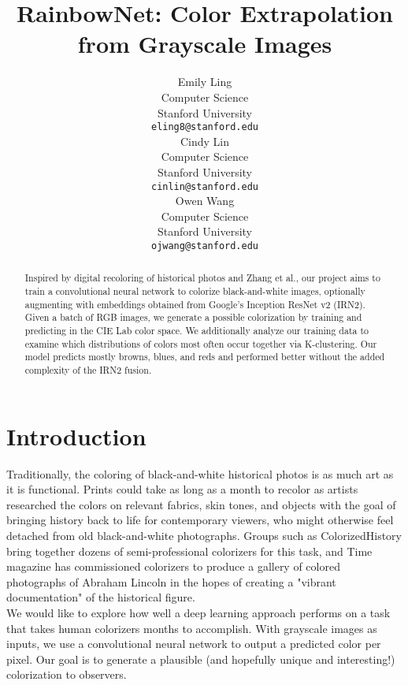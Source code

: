 \documentclass{article} %
\title{RainbowNet:  Color Extrapolation from Grayscale Images}
\author{
Emily Ling\\
Computer Science\\
Stanford University\\
\texttt{eling8@stanford.edu} \\
\And
Cindy Lin \\
Computer Science\\
Stanford University\\
\texttt{cinlin@stanford.edu} \\
\And
Owen Wang \\
Computer Science\\
Stanford University\\
\texttt{ojwang@stanford.edu} \\
}
\begin{document}
\maketitle


\begin{abstract}

Inspired by digital recoloring of historical photos and Zhang et al.\cite{zhang}, our project aims to train a convolutional neural network to colorize black-and-white images, optionally augmenting with embeddings obtained from Google's Inception ResNet v2 (IRN2)\cite{resnet}. Given a batch of RGB images, we generate a possible colorization by training and predicting in the CIE Lab color space. We additionally analyze our training data to examine which distributions of colors most often occur together via K-clustering. Our model predicts mostly browns, blues, and reds and performed better without the added complexity of the IRN2 fusion.

\end{abstract}

\section{Introduction}

Traditionally, the coloring of black-and-white historical photos is as much art as it is functional. Prints could take as long as a month to recolor as artists researched the colors on relevant fabrics, skin tones, and objects with the goal of bringing history back to life for contemporary viewers, who might otherwise feel detached from old black-and-white photographs. Groups such as ColorizedHistory\cite{reddit} bring together dozens of semi-professional colorizers for this task, and Time magazine has commissioned colorizers to produce a gallery of colored photographs of Abraham Lincoln in the hopes of creating a "vibrant documentation" of the historical figure.\cite{lincoln}\\

We would like to explore how well a deep learning approach performs on a task that takes human colorizers months to accomplish. With grayscale images as inputs, we use a convolutional neural network to output a predicted color per pixel. Our goal is to generate a plausible (and hopefully unique and interesting!) colorization to observers.
\end{document}
